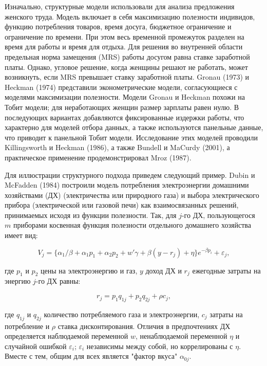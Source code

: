 Изначально, структурные модели использовали для анализа предложения женского труда. Модель включает в себя максимизацию полезности индивидов, функцию потребления товаров, время досуга, бюджетное ограничение и ограничение по времени. При этом весь временной промежуток разделен на время для работы и время для отдыха. Для решения во внутренней области предельная норма замещения (MRS) работы досугом равна ставке заработной платы. Однако, угловое решение, когда женщины решают не работать, может возникнуть, если MRS превышает ставку заработной платы. Gronau (1973) и Heckman (1974) представили эконометрические модели, согласующиеся с моделями максимизации полезности. Модели Gronau и Heckman похожи на Тобит модели; для неработающих женщин размер зарплаты равен нулю. В последующих вариантах добавляются фиксированные издержки работы, что характерно для моделей отбора данных, а также используются панельные данные, что приводит к панельной Тобит модели. Исследование этих моделей проводили Killingsworth и Heckman (1986), а также Bundell и MaCurdy (2001), а практическое применение продемонстрировал Mroz (1987).


Для иллюстрации структурного подхода приведем следующий пример. Dubin и McFadden (1984) построили модель потребления электроэнергии домашними хозяйствами (ДХ) (электричества или природного газа) и выбора электрического прибора (электрической или газовой печи) как взаимосвязанных решений, принимаемых исходя из функции полезности. Так, для $j$-го ДХ, пользующегося $m$ приборами косвенная функция полезности отдельного домашнего хозяйства имеет вид:

\begin{equation}
V_j=\lbrace\alpha_1/\beta+\alpha_1{p_1}+\alpha_2{p_2}+w'\gamma+\beta(y-r_j)+\eta\rbrace{e}^{-{\beta}p_i}+\varepsilon_j,
\end{equation}

где $p_1$ и $p_2$ цены на электроэнергию и газ, $y$ доход ДХ и $r_j$ ежегодные затраты на энергию $j$-го ДХ равны:

\[
r_j=p_1q_{1j}+p_2q_{2j}+\rho{c}_j,
\]

где $q_{1j}$ и $q_{2j}$ количество потребляемого газа и электроэнергии, $c_j$ затраты на потребление и $\rho$ ставка дисконтирования. Отличия в предпочтениях ДХ определяется наблюдаемой переменной $w$, ненаблюдаемой переменной $\eta$ и случайной ошибкой $\varepsilon_i$; $\varepsilon_i$ независимы между собой, но коррелированы с $\eta$. Вместе с тем, общим для всех является "фактор вкуса" $\alpha_{0j}$.


